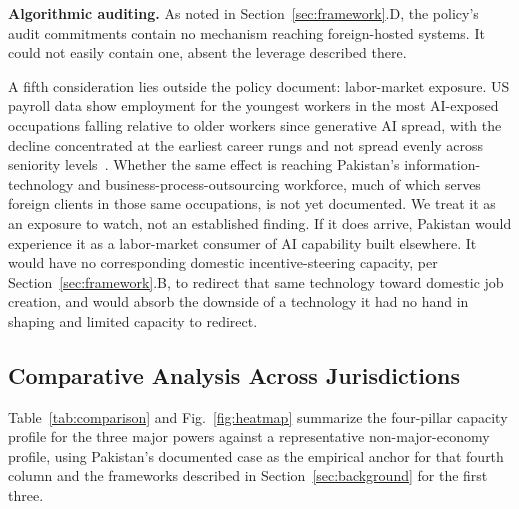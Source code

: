 \documentclass{ieeeaccess}
\begin{document}
\textbf{Algorithmic auditing.} As noted in Section~\ref{sec:framework}.D, the policy's audit commitments contain no mechanism reaching foreign-hosted systems. It could not easily contain one, absent the leverage described there.

A fifth consideration lies outside the policy document: labor-market exposure. US payroll data show employment for the youngest workers in the most AI-exposed occupations falling relative to older workers since generative AI spread, with the decline concentrated at the earliest career rungs and not spread evenly across seniority levels~\cite{brynjolfsson2025canaries}.
Whether the same effect is reaching Pakistan's information-technology and business-process-outsourcing workforce, much of which serves foreign clients in those same occupations, is not yet documented. We treat it as an exposure to watch, not an established finding. If it does arrive, Pakistan would experience it as a labor-market consumer of AI capability built elsewhere. It would have no corresponding domestic incentive-steering capacity, per Section~\ref{sec:framework}.B, to redirect that same technology toward domestic job creation, and would absorb the downside of a technology it had no hand in shaping and limited capacity to redirect.


\subsection{Comparative Analysis Across Jurisdictions}

Table~\ref{tab:comparison} and Fig.~\ref{fig:heatmap} summarize the four-pillar capacity profile for the three major powers against a representative non-major-economy profile, using Pakistan's documented case as the empirical anchor for that fourth column and the frameworks described in Section~\ref{sec:background} for the first three.
\end{document}
